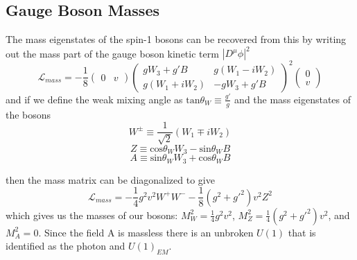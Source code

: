 \subsection{Gauge Boson Masses}
The mass eigenstates of the spin-1 bosons can be recovered from this by writing out the mass part of the gauge boson kinetic term $|D^\mu \phi|^2$
\[ \mathcal{L}_{mass} = -\frac{1}{8}\begin{pmatrix} 0 & v\end{pmatrix}\begin{pmatrix}gW_3+g' B & g(W_1 -iW_2)\\g(W_1+iW_2) & -gW_3+g'B\end{pmatrix}^2\begin{pmatrix}0\\v\end{pmatrix}
\]
and if we define the weak mixing angle as $\text{tan}\theta_W \equiv \frac{g'}{g}$ and the mass eigenstates of the bosons
\[W^\pm\equiv\frac{1}{\sqrt{2}}(W_1\mp iW_2)\]
\[Z \equiv \text{cos}\theta_W W_3 -\text{sin}\theta_W B\]
\[A \equiv \text{sin}\theta_W W_3 +\text{cos}\theta_W B\]

then the mass matrix can be diagonalized to give 
\[ \mathcal{L}_{mass} = -\frac{1}{4} g^2 v^2 W^+ W^- -\frac{1}{8}(g^2 + g'^2)v^2 Z^2 \]
which gives us the masses of our bosons: $M_W^2 = \frac{1}{4}g^2 v^2$, $M_Z^2=\frac{1}{4}(g^2 +g'^2)v^2$, and $M_A^2=0$.  Since the field A is massless there is an unbroken $U(1)$ that is identified as the photon and $U(1)_{EM}$.

